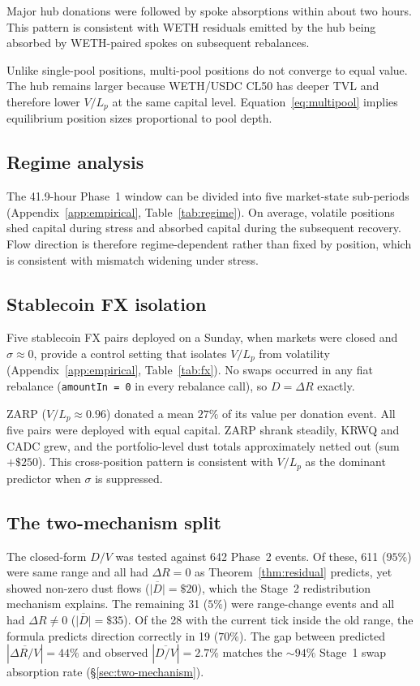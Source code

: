 \documentclass[11pt,a4paper]{article}
\theoremstyle{plain}
\begin{document}
Major hub donations were followed by spoke absorptions within about two hours. This pattern is consistent with WETH residuals emitted by the hub being absorbed by WETH-paired spokes on subsequent rebalances.

Unlike single-pool positions, multi-pool positions do not converge to equal value. The hub remains larger because WETH/USDC CL50 has deeper TVL and therefore lower $V/L_p$ at the same capital level. Equation~\eqref{eq:multipool} implies equilibrium position sizes proportional to pool depth.

\subsection{Regime analysis}\label{sec:regime}

The 41.9-hour Phase~1 window can be divided into five market-state sub-periods (Appendix~\ref{app:empirical}, Table~\ref{tab:regime}). On average, volatile positions shed capital during stress and absorbed capital during the subsequent recovery. Flow direction is therefore regime-dependent rather than fixed by position, which is consistent with mismatch widening under stress.

\subsection{Stablecoin FX isolation}\label{sec:fx-isolation}

Five stablecoin FX pairs deployed on a Sunday, when markets were closed and $\sigma \approx 0$, provide a control setting that isolates $V/L_p$ from volatility (Appendix~\ref{app:empirical}, Table~\ref{tab:fx}). No swaps occurred in any fiat rebalance (\texttt{amountIn = 0} in every rebalance call), so $D = \Delta R$ exactly.

ZARP ($V/L_p \approx 0.96$) donated a mean $27\%$ of its value per donation event. All five pairs were deployed with equal capital. ZARP shrank steadily, KRWQ and CADC grew, and the portfolio-level dust totals approximately netted out (sum $+\$250$). This cross-position pattern is consistent with $V/L_p$ as the dominant predictor when $\sigma$ is suppressed.

\subsection{The two-mechanism split}\label{sec:two-mechanism-split}

The closed-form $D/V$ was tested against 642 Phase~2 events. Of these, 611 ($95\%$) were same range and all had $\Delta R = 0$ as Theorem~\ref{thm:residual} predicts, yet showed non-zero dust flows ($\overline{|D|} = \$20$), which the Stage~2 redistribution mechanism explains. The remaining 31 ($5\%$) were range-change events and all had $\Delta R \neq 0$ ($\overline{|D|} = \$35$). Of the 28 with the current tick inside the old range, the formula predicts direction correctly in 19 ($70\%$). The gap between predicted $|\overline{\Delta R/V}| = 44\%$ and observed $|\overline{D/V}| = 2.7\%$ matches the ${\sim}94\%$ Stage~1 swap absorption rate (\S\ref{sec:two-mechanism}).
\end{document}
